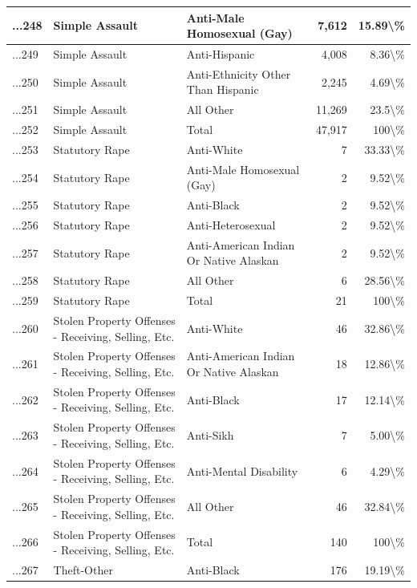 \documentclass[
]{krantz}
\begin{document}
\begin{longtable}[t]{l|l|l|r|r}
\hline
...248 & Simple Assault & Anti-Male Homosexual (Gay) & 7,612 & 15.89\textbackslash{}\%\\
\hline
...249 & Simple Assault & Anti-Hispanic & 4,008 & 8.36\textbackslash{}\%\\
\hline
...250 & Simple Assault & Anti-Ethnicity Other Than Hispanic & 2,245 & 4.69\textbackslash{}\%\\
\hline
...251 & Simple Assault & All Other & 11,269 & 23.5\textbackslash{}\%\\
\hline
...252 & Simple Assault & Total & 47,917 & 100\textbackslash{}\%\\
\hline
...253 & Statutory Rape & Anti-White & 7 & 33.33\textbackslash{}\%\\
\hline
...254 & Statutory Rape & Anti-Male Homosexual (Gay) & 2 & 9.52\textbackslash{}\%\\
\hline
...255 & Statutory Rape & Anti-Black & 2 & 9.52\textbackslash{}\%\\
\hline
...256 & Statutory Rape & Anti-Heterosexual & 2 & 9.52\textbackslash{}\%\\
\hline
...257 & Statutory Rape & Anti-American Indian Or Native Alaskan & 2 & 9.52\textbackslash{}\%\\
\hline
...258 & Statutory Rape & All Other & 6 & 28.56\textbackslash{}\%\\
\hline
...259 & Statutory Rape & Total & 21 & 100\textbackslash{}\%\\
\hline
...260 & Stolen Property Offenses - Receiving, Selling, Etc. & Anti-White & 46 & 32.86\textbackslash{}\%\\
\hline
...261 & Stolen Property Offenses - Receiving, Selling, Etc. & Anti-American Indian Or Native Alaskan & 18 & 12.86\textbackslash{}\%\\
\hline
...262 & Stolen Property Offenses - Receiving, Selling, Etc. & Anti-Black & 17 & 12.14\textbackslash{}\%\\
\hline
...263 & Stolen Property Offenses - Receiving, Selling, Etc. & Anti-Sikh & 7 & 5.00\textbackslash{}\%\\
\hline
...264 & Stolen Property Offenses - Receiving, Selling, Etc. & Anti-Mental Disability & 6 & 4.29\textbackslash{}\%\\
\hline
...265 & Stolen Property Offenses - Receiving, Selling, Etc. & All Other & 46 & 32.84\textbackslash{}\%\\
\hline
...266 & Stolen Property Offenses - Receiving, Selling, Etc. & Total & 140 & 100\textbackslash{}\%\\
\hline
...267 & Theft-Other & Anti-Black & 176 & 19.19\textbackslash{}\%\\

\end{longtable}
\end{document}
